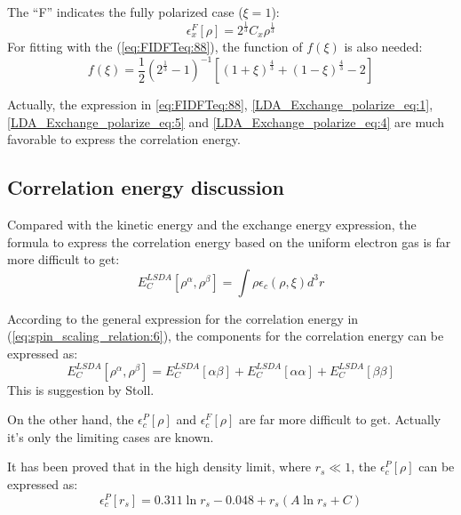 The ``F'' indicates the fully polarized case ($\xi = 1$):
\begin{equation}\label{LDA_Exchange_polarize_eq:3}
\epsilon_{x}^{F}[\rho] = 2^{\frac{1}{3}}C_{x}\rho^{\frac{1}{3}}
\end{equation}
For fitting with the (\ref{eq:FIDFTeq:88}), the function of $f(\xi)$
is also needed:
\begin{equation}\label{LDA_Exchange_polarize_eq:4}
f(\xi) = \frac{1}{2}(2^{\frac{1}{3}} - 1)^{-1}[(1+\xi)^{\frac{4}{3}}
+ (1-\xi)^{\frac{4}{3}} - 2]
\end{equation}

Actually, the expression in \ref{eq:FIDFTeq:88},
\ref{LDA_Exchange_polarize_eq:1},
\ref{LDA_Exchange_polarize_eq:5} and \ref{LDA_Exchange_polarize_eq:4} 
are much favorable to express the correlation energy. 




\subsection{Correlation energy discussion}
\label{sec:CED_in_functional}
%
%
%
%
Compared with the kinetic energy and the exchange energy expression,
the formula to express the correlation energy based on the uniform
electron gas is far more difficult to get\cite{weitaoYang,
  DFT_PAPERS_GATHERING}:
\begin{equation}\label{}
E_{C}^{LSDA}[\rho^{\alpha}, \rho^{\beta}] = \int \rho
\epsilon_{c}(\rho, \xi)d^{3}r
\end{equation}

According to the general expression for the correlation energy in
(\ref{eq:spin_scaling_relation:6}), the components for the correlation 
energy can be expressed as:
\begin{equation}
  E_{C}^{LSDA}[\rho^{\alpha}, \rho^{\beta}] =
  E_{C}^{LSDA}[\alpha\beta] + E_{C}^{LSDA}[\alpha\alpha] + E_{C}^{LSDA}[\beta\beta]
\end{equation}
This is suggestion by Stoll\cite{Stoll1978}.


On the other hand, the $\epsilon_{c}^{P}[\rho]$ and
$\epsilon_{c}^{F}[\rho]$ are far more difficult to get. Actually it's
only the limiting cases are known.

It has been proved\cite{PhysRev.106.364, PhysRev.133.A371} that in
the high density limit, where $r_{s}\ll 1$, the
$\epsilon_{c}^{P}[\rho]$ can be expressed as:
\begin{equation}
\label{eq:FIDFTeq:71}
\epsilon_{c}^{P}[r_{s}] = 0.311\ln r_{s} -
0.048 + r_{s}(A\ln r_{s} + C)
\end{equation}


